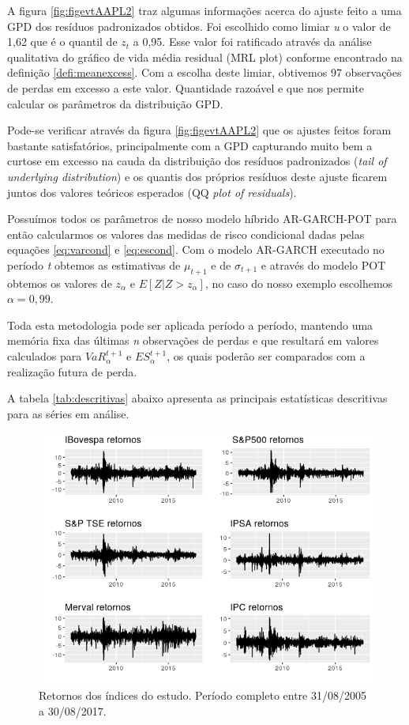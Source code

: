 \documentclass[review]{elsarticle}
\theoremstyle{definition}
\begin{document}
A figura \ref{fig:figevtAAPL2} traz algumas informações acerca do ajuste feito a uma GPD dos resíduos padronizados obtidos. Foi escolhido como limiar \emph{u} o valor de 1,62 que é o quantil de $z_t$ a 0,95. Esse valor foi ratificado através da análise qualitativa do gráfico de vida média residual (MRL plot) conforme encontrado na definição \ref{defi:meanexcess}. Com a escolha deste limiar, obtivemos 97 observações de perdas em excesso a este valor. Quantidade razoável e que nos permite calcular os parâmetros da distribuição GPD.

Pode-se verificar através da figura \ref{fig:figevtAAPL2} que os ajustes feitos foram bastante satisfatórios, principalmente com a GPD capturando muito bem a curtose em excesso na cauda da distribuição dos resíduos padronizados (\emph{tail of underlying distribution}) e os quantis dos próprios resíduos deste ajuste ficarem juntos dos valores teóricos esperados (QQ \emph{plot of residuals}).

Possuímos todos os parâmetros de nosso modelo híbrido AR-GARCH-POT para então calcularmos os valores das medidas de risco condicional dadas pelas equações \eqref{eq:varcond} e \eqref{eq:escond}. Com o modelo AR-GARCH executado no período \emph{t} obtemos as estimativas de $\mu_{t+1}$ e de $\sigma_{t+1}$ e através do modelo POT obtemos os valores de $z_\alpha$ e $E[Z|Z>z_\alpha]$, no caso do nosso exemplo escolhemos $\alpha=0,99$.

Toda esta metodologia pode ser aplicada período a período, mantendo uma memória fixa das últimas \emph{n} observações de perdas e que resultará em valores calculados para $VaR_\alpha^{t+1}$ e $ES_\alpha^{t+1}$, os quais poderão ser comparados com a realização futura de perda.

A tabela \ref{tab:descritivas} abaixo apresenta as principais estatísticas descritivas para as séries em análise.



\begin{figure}[h]
	\centering
	\includegraphics[width=0.9\linewidth]{artigo-retornos}
	\caption{Retornos dos índices do estudo. Período completo entre 31/08/2005 a 30/08/2017.}
	\label{fig:artigo-retornos}
\end{figure}
\end{document}

